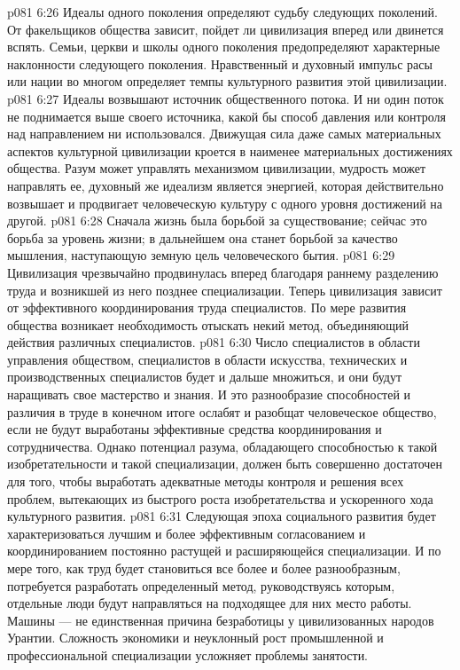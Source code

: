 \vs p081 6:26 \pc {}\bibnobreakspace {} Идеалы одного поколения определяют судьбу следующих поколений. От  факельщиков общества зависит, пойдет ли цивилизация вперед или двинется вспять. Семьи, церкви и школы одного поколения предопределяют характерные наклонности следующего поколения. Нравственный и духовный импульс расы или нации во многом определяет темпы культурного развития этой цивилизации.
\vs p081 6:27 Идеалы возвышают источник общественного потока. И ни один поток не поднимается выше своего источника, какой бы способ давления или контроля над направлением ни использовался. Движущая сила даже самых материальных аспектов культурной цивилизации кроется в наименее материальных достижениях общества. Разум может управлять механизмом цивилизации, мудрость может направлять ее, духовный же идеализм является энергией, которая действительно возвышает и продвигает человеческую культуру с одного уровня достижений на другой.
\vs p081 6:28 Сначала жизнь была борьбой за существование; сейчас это борьба за уровень жизни; в дальнейшем она станет борьбой за качество мышления, наступающую земную цель человеческого бытия.
\vs p081 6:29 \pc {}\bibnobreakspace {} Цивилизация чрезвычайно продвинулась вперед благодаря раннему разделению труда и возникшей из него позднее специализации. Теперь цивилизация зависит от эффективного координирования труда специалистов. По мере развития общества возникает необходимость отыскать некий метод, объединяющий действия различных специалистов.
\vs p081 6:30 Число специалистов в области управления обществом, специалистов в области искусства, технических и производственных специалистов будет и дальше множиться, и они будут наращивать свое мастерство и знания. И это разнообразие способностей и различия в труде в конечном итоге ослабят и разобщат человеческое общество, если не будут выработаны эффективные средства координирования и сотрудничества. Однако потенциал разума, обладающего способностью к такой изобретательности и такой специализации, должен быть совершенно достаточен для того, чтобы выработать адекватные методы контроля и решения всех проблем, вытекающих из быстрого роста изобретательства и ускоренного хода культурного развития.
\vs p081 6:31 \pc {}\bibnobreakspace {} Следующая эпоха социального развития будет характеризоваться лучшим и более эффективным согласованием и координированием постоянно растущей и расширяющейся специализации. И по мере того, как труд будет становиться все более и более разнообразным, потребуется разработать определенный метод, руководствуясь которым, отдельные люди будут направляться на подходящее для них место работы. Машины --- не единственная причина безработицы у цивилизованных народов Урантии. Сложность экономики и неуклонный рост промышленной и профессиональной специализации усложняет проблемы занятости.
